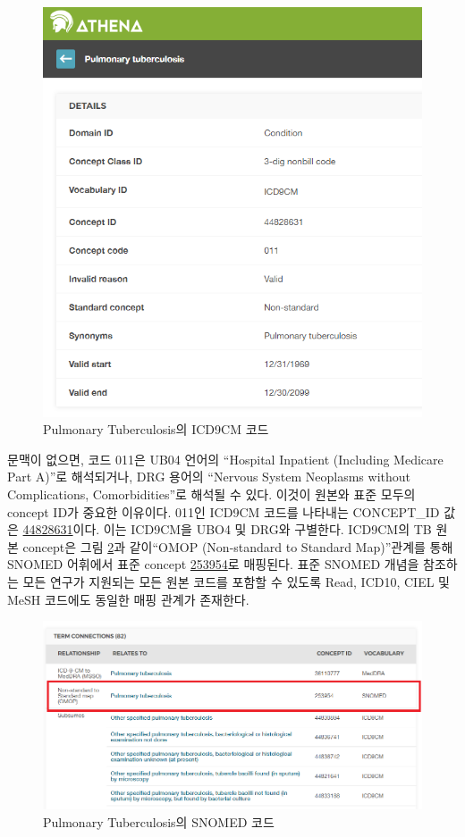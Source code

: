 \documentclass[11pt]{book}
\theoremstyle{definition}
\theoremstyle{definition}
\theoremstyle{definition}
\theoremstyle{remark}
\begin{document}
\begin{figure}

{\centering \includegraphics[width=0.75\linewidth]{images/CommonDataModel/pulmTubICD9} 

}

\caption{Pulmonary Tuberculosis의 ICD9CM 코드}\label{fig:pulmTubICD9}
\end{figure}

문맥이 없으면, 코드 011은 UB04 언어의 ``Hospital Inpatient (Including
Medicare Part A)''로 해석되거나, DRG 용어의 ``Nervous System Neoplasms
without Complications, Comorbidities''로 해석될 수 있다. 이것이 원본와
표준 모두의 concept ID가 중요한 이유이다. 011인 ICD9CM 코드를 나타내는
CONCEPT\_ID 값은
\href{http://athena.ohdsi.org/search-terms/terms/44828631}{44828631}이다.
이는 ICD9CM을 UBO4 및 DRG와 구별한다. ICD9CM의 TB 원본 concept은 그림
\ref{fig:pulmTubMap}과 같이``OMOP (Non-standard to Standard Map)''관계를
통해 SNOMED 어휘에서 표준 concept
\href{http://athena.ohdsi.org/search-terms/terms/253954}{253954}로
매핑된다. 표준 SNOMED 개념을 참조하는 모든 연구가 지원되는 모든 원본
코드를 포함할 수 있도록 Read, ICD10, CIEL 및 MeSH 코드에도 동일한 매핑
관계가 존재한다.

\begin{figure}
\includegraphics[width=1\linewidth]{images/CommonDataModel/pulmTubMap} \caption{Pulmonary Tuberculosis의 SNOMED 코드}\label{fig:pulmTubMap}
\end{figure}
\end{document}
